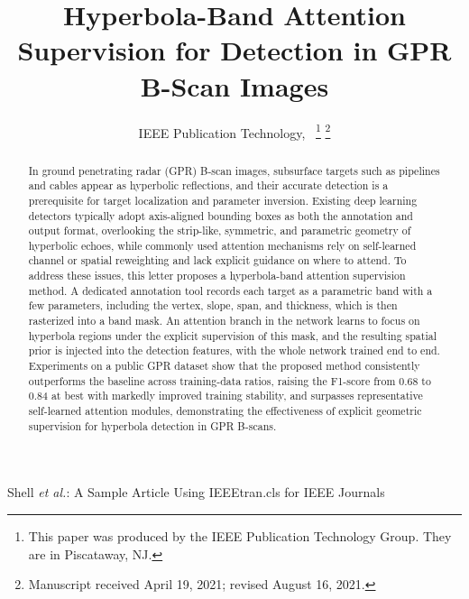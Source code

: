 \documentclass[lettersize,journal]{IEEEtran}
\begin{document}
\title{Hyperbola-Band Attention Supervision for Detection in GPR B-Scan Images}

\author{IEEE Publication Technology,~
\thanks{This paper was produced by the IEEE Publication Technology Group. They are in Piscataway, NJ.}%
\thanks{Manuscript received April 19, 2021; revised August 16, 2021.}}

%
{Shell \MakeLowercase{\textit{et al.}}: A Sample Article Using IEEEtran.cls for IEEE Journals}


\maketitle

\begin{abstract}
In ground penetrating radar (GPR) B-scan images, subsurface targets such as pipelines and cables appear as hyperbolic reflections, and their accurate detection is a prerequisite for target localization and parameter inversion. Existing deep learning detectors typically adopt axis-aligned bounding boxes as both the annotation and output format, overlooking the strip-like, symmetric, and parametric geometry of hyperbolic echoes, while commonly used attention mechanisms rely on self-learned channel or spatial reweighting and lack explicit guidance on where to attend. To address these issues, this letter proposes a hyperbola-band attention supervision method. A dedicated annotation tool records each target as a parametric band with a few parameters, including the vertex, slope, span, and thickness, which is then rasterized into a band mask. An attention branch in the network learns to focus on hyperbola regions under the explicit supervision of this mask, and the resulting spatial prior is injected into the detection features, with the whole network trained end to end. Experiments on a public GPR dataset show that the proposed method consistently outperforms the baseline across training-data ratios, raising the F1-score from 0.68 to 0.84 at best with markedly improved training stability, and surpasses representative self-learned attention modules, demonstrating the effectiveness of explicit geometric supervision for hyperbola detection in GPR B-scans.
\end{abstract}
\end{document}
